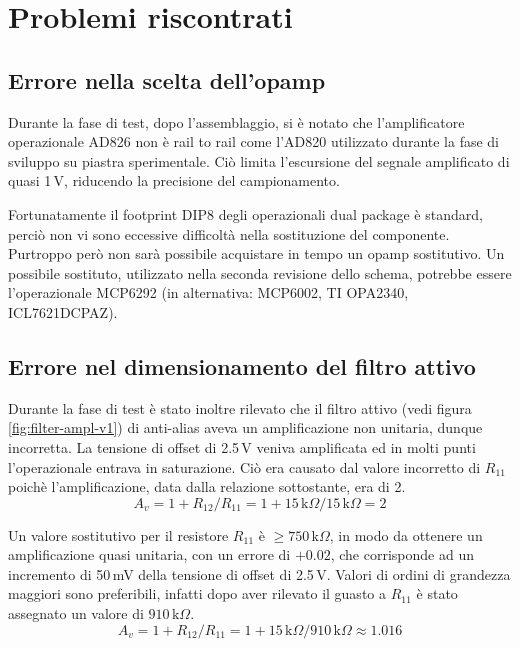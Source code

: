 \section{Problemi riscontrati}
\subsection{Errore nella scelta dell'opamp}
\label{sec:err-opamp}

Durante la fase di test, dopo l'assemblaggio, si \`e notato che
l'amplificatore operazionale AD826 non \`e rail to rail come l'AD820
utilizzato durante la fase di sviluppo su piastra sperimentale.  Ci\`o limita
l'escursione del segnale amplificato di quasi 1\,V, riducendo la precisione
del campionamento.

Fortunatamente il footprint DIP8 degli operazionali dual package \`e standard,
perci\`o non vi sono eccessive difficolt\`a nella sostituzione del componente.
Purtroppo per\`o non sar\`a possibile acquistare in tempo un opamp
sostitutivo. Un possibile sostituto, utilizzato nella seconda revisione dello
schema, potrebbe essere l'operazionale MCP6292 (in alternativa: MCP6002, TI
OPA2340, ICL7621DCPAZ).

\subsection{Errore nel dimensionamento del filtro attivo}
\label{sec:err-filter}

Durante la fase di test \`e stato inoltre rilevato che il filtro attivo (vedi
figura \ref{fig:filter-ampl-v1}) di anti-alias aveva un amplificazione non
unitaria, dunque incorretta.  La tensione di offset di 2.5\,V veniva
amplificata ed in molti punti l'operazionale entrava in saturazione.  Ci\`o
era causato dal valore incorretto di \(R_{11}\) poich\`e l'amplificazione,
data dalla relazione sottostante, era  di 2.
\[
    A_v = 1+R_{12}/R_{11} = 1+15\,\text{k}\Omega/15\,\text{k}\Omega = 2
\]

Un valore sostitutivo per il resistore \(R_{11}\) \`e
\(\geq 750\,\text{k}\Omega\), in modo da ottenere un amplificazione quasi
unitaria, con un errore di \(+0.02\), che corrisponde ad un incremento di
50\,mV della tensione di offset di 2.5\,V. Valori di ordini di grandezza
maggiori sono preferibili, infatti dopo aver rilevato il guasto a \(R_{11}\)
\`e stato assegnato un valore di \(910\,\text{k}\Omega\).
\[
    A_v = 1+R_{12}/R_{11} = 1+15\,\text{k}\Omega/910\,\text{k}\Omega \approx 1.016
\]

